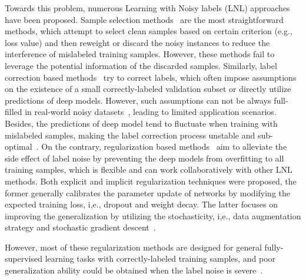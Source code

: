 \documentclass[10pt,twocolumn,letterpaper]{article}
\begin{document}
{Towards this problem, numerous Learning with Noisy labels (LNL) approaches {have been} proposed.}
{Sample selection methods~\cite{han2018co,yu2019does,wei2020combating,chen2019understanding} are the most straightforward methods, which} attempt to select clean samples based on certain criterion {(e.g., loss value)} and {then} reweight or {discard} the noisy instances to reduce the {{interference} of mislabeled training samples.}
However, these methods fail to {leverage} the potential information of the {discarded} samples. {Similarly}, label correction based methods~\cite{tanaka2018joint,yi2019probabilistic,zheng2021meta} try to correct labels, {which often impose assumptions on the existence of a small correctly-labeled validation subset or directly utilize predictions of deep models. However, such assumptions can not be always full-filled in real-world noisy datasets~\cite{song2019selfie}, leading to limited application scenarios. Besides, the predictions of deep model tend to fluctuate when training with mislabeled samples, making the label correction process unstable and sub-optimal~\cite{AAAI-2021-meta}.}
{On the contrary,} regularization based methods~\cite{arpit2017closer,song2022learning,liu2020early,zhou2021learning,ren2018learning,li2020dividemix,zheltonozhskii2022contrast,zhang2017mixup,goodfellow2014explaining} aim to alleviate the side effect of {label} noise by preventing the deep models from {overfitting to all training samples, which is flexible and can work collaboratively with other LNL methods}. {Both explicit and implicit regularization techniques were proposed, the}
former generally calibrates the parameter update of networks by modifying the expected training loss, \rm{i,e.}, dropout and weight decay. {The latter} focuses on improving the generalization by utilizing the stochasticity, \rm{i,e.}, data augmentation strategy and stochastic gradient descent~\cite{song2022learning}. 
\iffalse , and requires introducing model-dependent hyper-parameters or needs a deeper network to compensate for the reduced model capacity \fi
{However, most of these regularization methods are designed for general fully-supervised learning tasks with correctly-labeled training samples, and poor generalization ability could be obtained when the label noise is severe~\cite{song2022learning}}.
\end{document}
